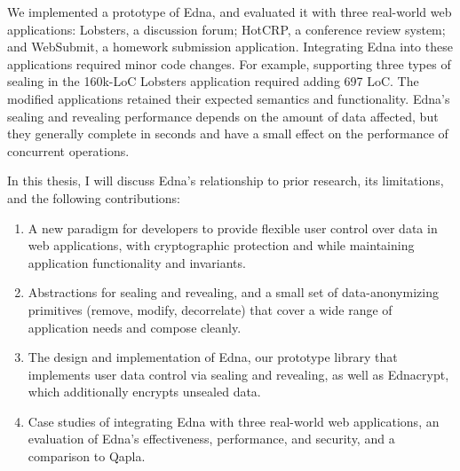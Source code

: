 We implemented a prototype of Edna, and evaluated it with three real-world web
applications: Lobsters, a discussion forum; HotCRP, a conference review system;
and WebSubmit, a homework submission application. Integrating Edna into these
applications required minor code changes. For example, supporting three types of
sealing in the 160k-LoC Lobsters application required adding 697 LoC. The
modified applications retained their expected semantics and functionality.
Edna's sealing and revealing performance depends on the amount of data affected,
but they generally complete in seconds and have a small effect on the
performance of concurrent operations.

In this thesis, I will discuss Edna's relationship to prior research, its
limitations, and the following contributions:
\begin{enumerate}[nosep] 
    \item A new paradigm for developers to provide flexible user control over data in web applications, with cryptographic protection and while maintaining application functionality and invariants.
    \item Abstractions for sealing and revealing, and a small set of data-anonymizing primitives (remove, modify, decorrelate) that cover a wide range of application needs and compose cleanly.
    \item The design and implementation of Edna, our prototype library that implements user data control via sealing and revealing, as well as Ednacrypt, which additionally encrypts unsealed data.
    \item Case studies of integrating Edna with three real-world web applications, an evaluation of Edna's effectiveness, performance, and security, and a comparison to Qapla.
\end{enumerate}

